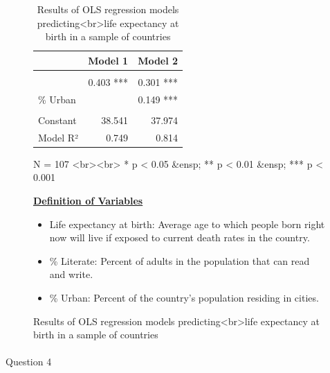 \documentclass[
  letterpaper,
  DIV=11,
  numbers=noendperiod,
  oneside]{scrartcl}
\makeatletter
\let\oldparagraph\paragraph
\renewcommand{\paragraph}{
    \@ifstar
      \xxxParagraphStar
      \xxxParagraphNoStar
  }
\newcommand{\xxxParagraphStar}[1]{\oldparagraph*{#1}\mbox{}}
\newcommand{\xxxParagraphNoStar}[1]{\oldparagraph{#1}\mbox{}}
\providecommand{\tightlist}{%
  \setlength{\itemsep}{0pt}\setlength{\parskip}{0pt}}\usepackage{longtable,booktabs,array}
\makeatother
\begin{document}
\begin{figure}

\begin{table}
\caption*{
{\large Results of OLS regression models predicting<br>life expectancy at birth in a sample of countries}
} 
\fontsize{12.0pt}{14.4pt}\selectfont
\begin{tabular*}{1\linewidth}{@{\extracolsep{\fill}}l|rr}
\toprule
 & Model 1 & Model 2 \\ 
\midrule\addlinespace[2.5pt]
\multicolumn{3}{>{\raggedright\arraybackslash}m{1\linewidth}}{Predictor} \\[2.5pt] 
\midrule\addlinespace[2.5pt]
{\hspace{15pt}\% Literate} & 0.403 *** & 0.301 *** \\ 
{\hspace{15pt}\% Urban} &  & 0.149 *** \\ 
\midrule\addlinespace[2.5pt]
\multicolumn{3}{>{\raggedright\arraybackslash}m{1\linewidth}}{\rule{0pt}{0pt}} \\[-3.2ex] 
\midrule\addlinespace[2.5pt]
Constant & 38.541 & 37.974 \\ 
Model R² & 0.749 & 0.814 \\ 
\bottomrule
\end{tabular*}
\begin{minipage}{\linewidth}
N = 107 <br><br> * p < 0.05 &ensp; ** p < 0.01 &ensp; *** p < 0.001\\
\end{minipage}
\end{table}

\ul{\textbf{Definition of Variables}}

\begin{itemize}
\tightlist
\item
  Life expectancy at birth: Average age to which people born right now
  will live if exposed to current death rates in the country.
\item
  \% Literate: Percent of adults in the population that can read and
  write.
\item
  \% Urban: Percent of the country's population residing in cities.
\end{itemize}

\end{figure}%

\newpage{}

\paragraph{Question 4}\label{question-4}
\end{document}
